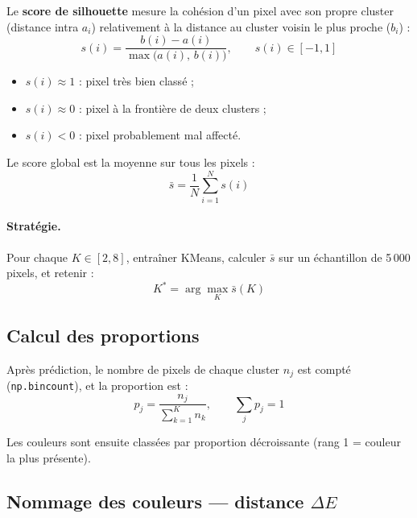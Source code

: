 \documentclass[11pt,a4paper]{article}
\begin{document}
Le \textbf{score de silhouette} mesure la cohésion d'un pixel avec son
propre cluster (distance intra $a_i$) relativement à la distance au cluster
voisin le plus proche ($b_i$) :
\begin{equation}
  s(i) = \frac{b(i) - a(i)}{\max\bigl(a(i),\, b(i)\bigr)}, \qquad
  s(i) \in [-1, 1]
  \label{eq:silhouette}
\end{equation}

\begin{itemize}
  \item $s(i) \approx 1$ : pixel très bien classé ;
  \item $s(i) \approx 0$ : pixel à la frontière de deux clusters ;
  \item $s(i) < 0$ : pixel probablement mal affecté.
\end{itemize}

Le score global est la moyenne sur tous les pixels :
\begin{equation}
  \bar{s} = \frac{1}{N}\sum_{i=1}^{N} s(i)
  \label{eq:silhouette-mean}
\end{equation}

\paragraph{Stratégie.}
Pour chaque $K \in [2, 8]$, entraîner KMeans, calculer $\bar{s}$ sur un
échantillon de 5\,000 pixels, et retenir :
\begin{equation}
  K^* = \arg\max_{K} \bar{s}(K)
  \label{eq:bestk}
\end{equation}

\subsection{Calcul des proportions}

Après prédiction, le nombre de pixels de chaque cluster $n_j$ est compté
(\texttt{np.bincount}), et la proportion est :
\begin{equation}
  p_j = \frac{n_j}{\sum_{k=1}^{K} n_k}, \qquad \sum_{j} p_j = 1
  \label{eq:proportions}
\end{equation}

Les couleurs sont ensuite classées par proportion décroissante (rang 1 =
couleur la plus présente).

\subsection{Nommage des couleurs --- distance $\Delta E$}
\end{document}
